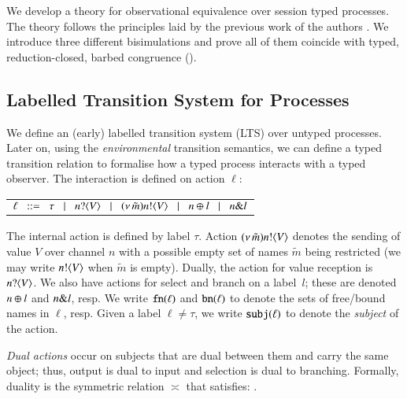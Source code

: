 \noi We develop a theory for observational equivalence over
session typed \HOp processes. The theory follows the principles
laid by the previous work of the authors
\cite{KYHH2015,KY2015}.
We introduce three different bisimulations and prove
all of them coincide with typed, reduction-closed,
barbed congruence ().

\subsection{Labelled Transition System for Processes}\label{ss:lts}
\noi We define an (early) labelled transition system (LTS) over
untyped processes. 
Later on, using the \emph{environmental} transition semantics, 
we can define a typed transition relation to formalise 
how a typed process interacts with a typed observer. 
The interaction is defined on action $\ell$:
\begin{center}
\begin{tabular}{l}
	$\ell	\;\;::=\;\;   \tau 
		\;\;\;|\;\;\;	n ? \langle V \rangle 
		\;\;\;|\;\;\;	(\nu\, \tilde{m}) n ! \langle V \rangle
		\;\;\;|\;\;\;	n \oplus l 
		\;\;\;|\;\;\;	n \& l $
\end{tabular}
\end{center}
\noi The internal action is defined by label $\tau$.
Action $(\nu\, \tilde{m}) n ! \langle V \rangle$ denotes the sending of value $V$
over channel $n$ with
a possible empty set of names $\tilde{m}$ being restricted 
(we may write $n ! \langle V \rangle$ when $\tilde{m}$ is empty).
Dually, the action for value reception is 
$n ? \langle V \rangle$.
We also have actions for select
and branch on
a label~$l$; these are denoted $n \oplus l$ and $n \& l$, resp.
We write $\mathtt{fn}(\ell)$ and $\mathtt{bn}(\ell)$ to denote the
 sets of free/bound names in $\ell$, resp.
Given a label $\ell \neq \tau$, we write 
$\mathtt{subj}(\ell)$
to denote the \emph{subject} of the action.


\emph{Dual actions} %
occur on subjects that are dual between them and carry the same
object; thus, output is dual to input and 
selection is dual to branching.
Formally, duality 
is the symmetric relation $\asymp$ that satisfies:
.
%
%
\smallskip


